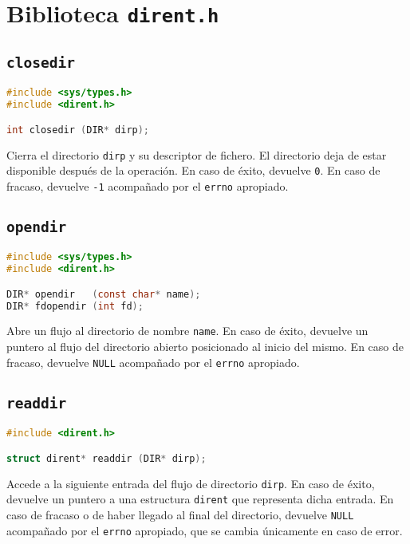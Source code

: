 \chapter{Biblioteca \texttt{dirent.h}}

\section{\texttt{closedir}}\label{closedir}

\begin{lstlisting}[language=C]
#include <sys/types.h>
#include <dirent.h>

int closedir (DIR* dirp);
\end{lstlisting}

Cierra el directorio \texttt{dirp} y su descriptor de fichero.
El directorio deja de estar disponible después de la operación.
En caso de éxito, devuelve \texttt{0}.
En caso de fracaso, devuelve \texttt{-1} acompañado por el \texttt{errno} apropiado.

\section{\texttt{opendir}}\label{opendir}

\begin{lstlisting}[language=C]
#include <sys/types.h>
#include <dirent.h>

DIR* opendir   (const char* name);
DIR* fdopendir (int fd);
\end{lstlisting}

Abre un flujo al directorio de nombre \texttt{name}.
En caso de éxito, devuelve un puntero al flujo del directorio abierto posicionado al inicio del mismo.
En caso de fracaso, devuelve \texttt{NULL} acompañado por el \texttt{errno} apropiado.

\section{\texttt{readdir}}\label{readdir}

\begin{lstlisting}[language=C]
#include <dirent.h>

struct dirent* readdir (DIR* dirp);
\end{lstlisting}

Accede a la siguiente entrada del flujo de directorio \texttt{dirp}.
En caso de éxito, devuelve un puntero a una estructura \texttt{dirent} que representa dicha entrada.
En caso de fracaso o de haber llegado al final del directorio, devuelve \texttt{NULL} acompañado por el \texttt{errno} apropiado, que se cambia únicamente en caso de error.

